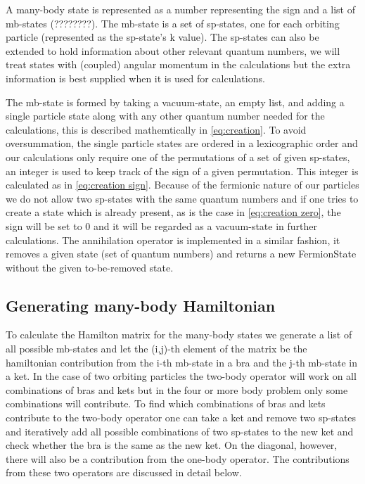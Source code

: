A many-body state is represented as a number representing the sign and a list of mb-states (????????).
 The mb-state is a set of sp-states, one for each orbiting particle (represented as the sp-state's k value). 
 The sp-states can also be extended to hold information about other relevant quantum numbers, we will treat states with (coupled) angular momentum in the calculations but the extra information is best supplied when it is used for calculations.
 
 
 

The mb-state is formed by taking a vacuum-state, an empty list, and adding a single particle state along with any other quantum number needed for the calculations, this is described mathemtically in \cref{eq:creation}.
To avoid oversummation, the single particle states are ordered in a lexicographic order and our calculations only require one of the permutations of a set of given sp-states, an integer is used to keep track of the sign of a given permutation. 
This integer is calculated as in \cref{eq:creation sign}.
Because of the fermionic nature of our particles we do not allow two sp-states with the same quantum numbers and if one tries to create a state which is already present, as is the case in \cref{eq:creation zero}, the sign will be set to 0 and it will be regarded as a vacuum-state in further calculations.
The annihilation operator is implemented in a similar fashion, it removes a given state (set of quantum numbers) and returns a new FermionState without the given to-be-removed state.
 
 
\subsection{Generating many-body Hamiltonian}
To calculate the Hamilton matrix for the many-body states we generate a list of all possible mb-states and let the (i,j)-th element of the matrix be the hamiltonian contribution from the i-th mb-state in a bra and the j-th mb-state in a ket. 
 In the case of two orbiting particles the two-body operator will work on all combinations of bras and kets but in the four or more body problem only some combinations will contribute.
 To find which combinations of bras and kets contribute to the two-body operator one can take a ket and remove two sp-states and iteratively add all possible combinations of two sp-states to the new ket and check whether the bra is the same as the new ket.
 On the diagonal, however, there will also be a contribution from the one-body operator.
 The contributions from these two operators are discussed in detail below.

